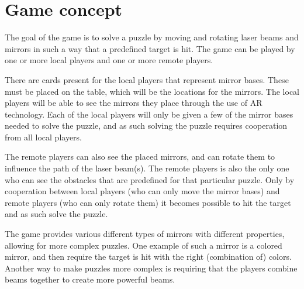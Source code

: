 \section{Game concept}

The goal of the game is to solve a puzzle by moving and rotating laser beams and 
mirrors in such a way that a predefined target is hit. The game can be played by 
one or more local players and one or more remote players.

There are cards present for the local players that represent mirror bases. These 
must be placed on the table, which will be the locations for the mirrors. The local
players will be able to see the mirrors they place through the use of AR technology.
Each of the local players will only be given a few of the mirror bases needed to solve
the puzzle, and as such solving the puzzle requires cooperation from all local players.

The remote players can also see the placed mirrors, and can rotate them to influence 
the path of the laser beam(s). The remote players is also the only one who can see the
obstacles that are predefined for that particular puzzle. Only by cooperation between 
local players (who can only move the mirror bases) and remote players (who can only 
rotate them) it becomes possible to hit the target and as such solve the puzzle.

The game provides various different types of mirrors with different properties, 
allowing for more complex puzzles. One example of such a mirror is a colored mirror, 
and then require the target is hit with the right (combination of) colors. Another 
way to make puzzles more  complex is requiring that the players combine beams together
to create more powerful beams.
